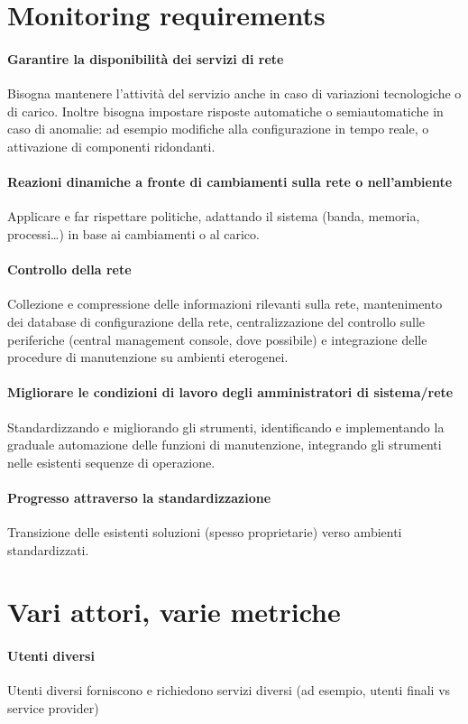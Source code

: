 \documentclass[10pt]{book}
\begin{document}
\section{Monitoring requirements}
\paragraph{Garantire la disponibilità dei servizi di rete} Bisogna mantenere l'attività del servizio anche in caso di variazioni tecnologiche o di carico. Inoltre bisogna impostare risposte automatiche o semiautomatiche in caso di anomalie: ad esempio modifiche alla configurazione in tempo reale, o attivazione di componenti ridondanti.
\paragraph{Reazioni dinamiche a fronte di cambiamenti sulla rete o nell'ambiente} Applicare e far rispettare politiche, adattando il sistema (banda, memoria, processi\ldots) in base ai cambiamenti o al carico.
\paragraph{Controllo della rete} Collezione e compressione delle informazioni rilevanti sulla rete, mantenimento dei database di configurazione della rete, centralizzazione del controllo sulle periferiche (central management console, dove possibile) e integrazione delle procedure di manutenzione su ambienti eterogenei.
\paragraph{Migliorare le condizioni di lavoro degli amministratori di sistema/rete} Standardizzando e migliorando gli strumenti, identificando e implementando la graduale automazione delle funzioni di manutenzione, integrando gli strumenti nelle esistenti sequenze di operazione.
\paragraph{Progresso attraverso la standardizzazione} Transizione delle esistenti soluzioni (spesso proprietarie) verso ambienti standardizzati.
\section{Vari attori, varie metriche}
\paragraph{Utenti diversi} Utenti diversi forniscono e richiedono servizi diversi (ad esempio, utenti finali vs service provider)
\end{document}
